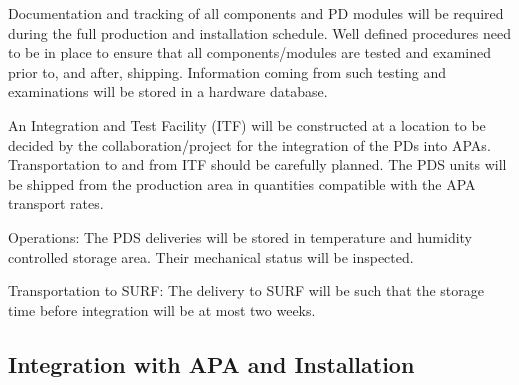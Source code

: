 Documentation and tracking of all components and PD modules will be required during the full production and installation schedule. Well defined procedures need to be in place to ensure that all components/modules are tested and examined prior to, and after, shipping. Information coming from such testing and examinations will be stored in a hardware database.

An Integration and Test Facility (ITF) will be constructed at a location to be decided by the collaboration/project for the integration of the PDs into APAs. Transportation to and from ITF should be carefully planned. The PDS units will be shipped from the production area in quantities compatible with the APA transport rates.
    
Operations: The PDS deliveries will be stored in temperature and humidity controlled storage area. Their mechanical status will be inspected.

Transportation to SURF: The delivery to SURF will be such that the storage time before integration will be at most two weeks.


\subsection{Integration with APA and Installation}
\label{sec:fdsp-pd-install-pd-apa}




